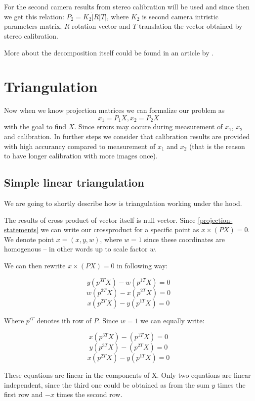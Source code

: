 For the second camera results from stereo calibration will be used and since
then we get this relation: $P_2 = K_2 \dot [R | T]$, where $K_2$ is second
camera intristic parameters matrix, $R$ rotation vector and $T$ translation
the vector obtained by stereo calibration.

More about the decomposition itself could be found in an article by \citet{computervisionblog}.

\section{Triangulation}
Now when we know projection matrices we can formalize our problem as
\begin{equation}
x_1 = P_1X, x_2 = P_2X \label{projection-statements}
\end{equation}
with the goal to find $X$. Since errors may occure during
measurement of $x_1$, $x_2$ and calibration. In further steps we consider that
calibration results are provided with high accurancy compared to measurement of
$x_1$ and $x_2$ (that is the reason to have longer calibration with more images
once).

\subsection{Simple linear triangulation}
We are going to shortly describe how is triangulation working under the hood.

The results of cross product of vector itself is null vector. Since
\ref{projection-statements} we can write our crossproduct for a specific point
as $x \times (PX) = 0$. We denote point $x = (x, y, w)$, where $w = 1$ since
these coordinates are homogenous -- in other words up to scale factor $w$.

We can then rewrite $x \times (PX) = 0$ in following way:

$$ y(p^{3T}X) - w(p^{1T}X) = 0 $$
$$ w(p^{3T}X) - x(p^{2T}X) = 0 $$
$$ x(p^{2T}X) - y(p^{1T}X) = 0 $$

Where $p^{iT}$ denotes ith row of $P$. Since $w = 1$ we can equally write:

$$ x(p^{3T}X) - (p^{1T}X) = 0 $$
$$ y(p^{3T}X) - (p^{2T}X) = 0 $$
$$ x(p^{2T}X) - y(p^{1T}X) = 0 $$

These equations are linear in the components of X. Only two equations are
linear independent, since the third one could be obtained as from the sum $y$
times the first row and $-x$ times the second row.

